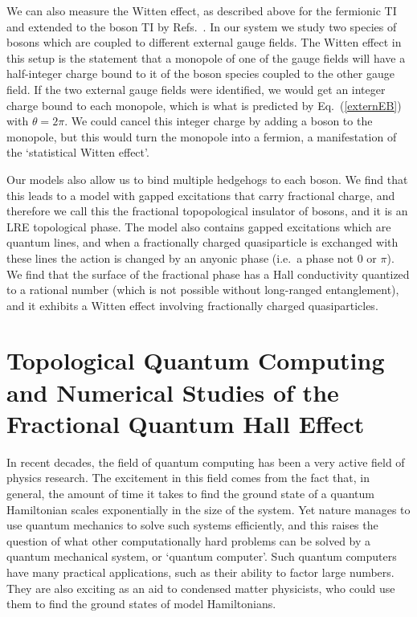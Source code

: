 We can also measure the Witten effect, as described above for the fermionic TI and extended to the boson TI by Refs.~\cite{Max,MaxWitten}. In our system we study two species of bosons which are coupled to different external gauge fields. The Witten effect in this setup is the statement that a monopole of one of the gauge fields will have a half-integer charge bound to it of the boson species coupled to the other gauge field. If the two external gauge fields were identified, we would get an integer charge bound to each monopole, which is what is predicted by Eq.~(\ref{externEB}) with $\theta=2\pi$. We could cancel this integer charge by adding a boson to the monopole, but this would turn the monopole into a fermion, a manifestation of the `statistical Witten effect'\cite{Max,MaxWitten}.

Our models also allow us to bind multiple hedgehogs to each boson. We find that this leads to a model with gapped excitations that carry fractional charge, and therefore we call this the fractional topopological insulator of bosons, and it is an LRE topological phase. The model also contains gapped excitations which are quantum lines, and when a fractionally charged quasiparticle is exchanged with these lines the action is changed by an anyonic phase (i.e.~a phase not $0$ or $\pi$). We find that the surface of the fractional phase has a Hall conductivity quantized to a rational number (which is not possible without long-ranged entanglement), and it exhibits a Witten effect involving fractionally charged quasiparticles.

\section{Topological Quantum Computing and Numerical Studies of the Fractional Quantum Hall Effect}

In recent decades, the field of quantum computing has been a very active field of physics research. The excitement in this field comes from the fact that, in general, the amount of time it takes to find the ground state of a quantum Hamiltonian scales exponentially in the size of the system. Yet nature manages to use quantum mechanics to solve such systems efficiently, and this raises the question of what other computationally hard problems can be solved by a quantum mechanical system, or `quantum computer'. Such quantum computers have many practical applications, such as their ability to factor large numbers. They are also exciting as an aid to condensed matter physicists, who could use them to find the ground states of model Hamiltonians.

